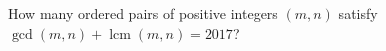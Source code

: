 How many ordered pairs of positive integers $(m,n)$ satisfy $\gcd(m,n)+\operatorname{lcm}(m,n)=2017 $?

